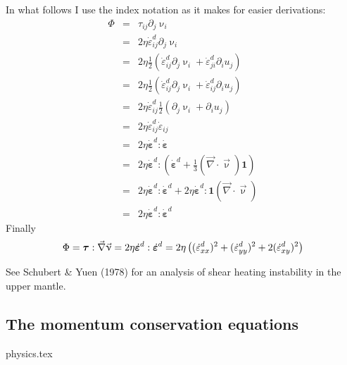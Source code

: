 In what follows I use the index notation as it makes for easier derivations:
\begin{eqnarray}
\Phi 
&=& \tau_{ij}\partial_j \upnu_i \nonumber\\
&=& 2 \eta \dot{\varepsilon}_{ij}^d\partial_j \upnu_i \nonumber\\
&=& 2 \eta \frac{1}{2}\left( \dot{\varepsilon}_{ij}^d\partial_j \upnu_i + \dot{\varepsilon}_{ji}^d\partial_i u_j \right) \nonumber\\
&=& 2 \eta \frac{1}{2}\left( \dot{\varepsilon}_{ij}^d\partial_j \upnu_i + \dot{\varepsilon}_{ij}^d\partial_i u_j \right) \nonumber\\
&=& 2 \eta  \dot{\varepsilon}_{ij}^d  \frac{1}{2}\left(\partial_j \upnu_i + \partial_i u_j \right) \nonumber\\
&=& 2 \eta  \dot{\varepsilon}_{ij}^d   \dot{\varepsilon}_{ij} \nonumber\\
&=& 2 \eta  \dot{\bm \varepsilon}^d :  \dot{\bm \varepsilon} \nonumber\\
&=& 2 \eta  \dot{\bm \varepsilon}^d : \left( \dot{\bm \varepsilon}^d +\frac{1}{3} ({\vec \nabla}\cdot{\vec \upnu}) {\bm 1} \right)\nonumber\\
&=& 2 \eta  \dot{\bm \varepsilon}^d : \dot{\bm \varepsilon}^d 
+ 2 \eta  \dot{\bm \varepsilon}^d : {\bm 1} ({\vec \nabla}\cdot{\vec \upnu}) \nonumber\\ 
&=& 2 \eta  \dot{\bm \varepsilon}^d : \dot{\bm \varepsilon}^d 
\end{eqnarray}
Finally
\begin{equation}
\Phi = {\bm \tau}:{\vec \nabla}{\vec \upnu} = 2 \eta  \dot{\bm \varepsilon}^d : \dot{\bm \varepsilon}^d
= 2 \eta \left( (\dot{\varepsilon}_{xx}^d)^2 + (\dot{\varepsilon}_{yy}^d)^2 + 2(\dot{\varepsilon}_{xy}^d)^2 \right) \nonumber
\end{equation}

See Schubert \& Yuen (1978) \cite{scyu78} for an analysis of shear heating instability in the upper mantle.

\subsection{The momentum conservation equations} 
\begin{flushright} {\tiny {\color{gray} physics.tex}} \end{flushright}

